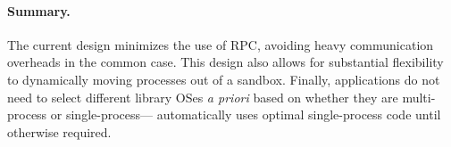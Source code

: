 \paragraph{Summary.}
The current \graphene{} design minimizes the use of RPC,
avoiding heavy communication overheads in the common case.
This design also allows for substantial flexibility to dynamically moving processes out of
a sandbox.  Finally, applications do not need to select different 
library OSes {\em a priori} based on whether they are multi-process or single-process---\graphene{}
automatically uses optimal single-process code until otherwise required.
